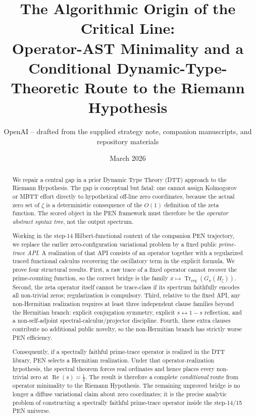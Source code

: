 \documentclass[11pt,a4paper]{article}
\title{\textbf{The Algorithmic Origin of the Critical Line:\\
Operator-AST Minimality and a Conditional Dynamic-Type-Theoretic Route to the Riemann Hypothesis}}
\author{OpenAI -- drafted from the supplied strategy note, companion manuscripts, and repository materials}
\date{March 2026}
\theoremstyle{plain}
\theoremstyle{definition}
\theoremstyle{remark}
\newcommand{\Trreg}{\operatorname{Tr}_{\mathrm{reg}}}
\newcommand{\Rea}{\operatorname{Re}}
\begin{document}
\maketitle

\begin{abstract}
We repair a central gap in a prior Dynamic Type Theory (DTT) approach to the Riemann Hypothesis. The gap is conceptual but fatal: one cannot assign Kolmogorov or MBTT effort directly to hypothetical off-line zero coordinates, because the actual zero set of $\zeta$ is a deterministic consequence of the $O(1)$ definition of the zeta function. The scored object in the PEN framework must therefore be the \emph{operator abstract syntax tree}, not the output spectrum.

Working in the step-14 Hilbert-functional context of the companion PEN trajectory, we replace the earlier zero-configuration variational problem by a fixed public \emph{prime-trace API}. A realization of that API consists of an operator together with a regularized traced functional calculus recovering the oscillatory term in the explicit formula. We prove four structural results. First, a raw trace of a fixed operator cannot recover the prime-counting function, so the correct bridge is the family $x \mapsto \Trreg(G_x(H_\zeta))$. Second, the zeta operator itself cannot be trace-class if its spectrum faithfully encodes all non-trivial zeros; regularization is compulsory. Third, relative to the fixed API, any non-Hermitian realization requires at least three independent clause families beyond the Hermitian branch: explicit conjugation symmetry, explicit $s\leftrightarrow 1-s$ reflection, and a non-self-adjoint spectral-calculus/projector discipline. Fourth, these extra clauses contribute no additional public novelty, so the non-Hermitian branch has strictly worse PEN efficiency.

Consequently, if a spectrally faithful prime-trace operator is realized in the DTT library, PEN selects a Hermitian realization. Under that operator-realization hypothesis, the spectral theorem forces real ordinates and hence places every non-trivial zero at $\Rea(s)=\tfrac12$. The result is therefore a complete \emph{conditional} route from operator minimality to the Riemann Hypothesis. The remaining unproved bridge is no longer a diffuse variational claim about zero coordinates; it is the precise analytic problem of constructing a spectrally faithful prime-trace operator inside the step-14/15 PEN universe.
\end{abstract}
\end{document}
